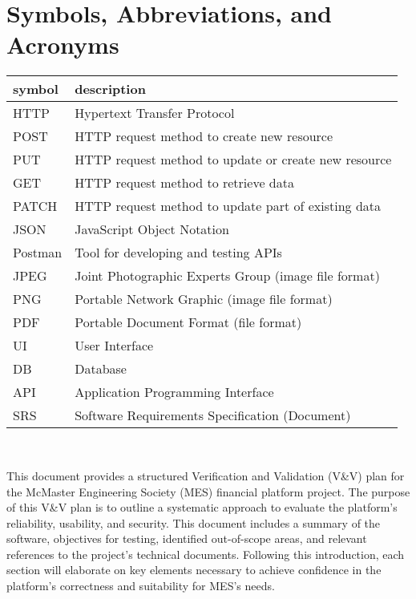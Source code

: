 \documentclass[12pt, titlepage]{article}
\begin{document}
\listoftables
{}

\newpage

\section{Symbols, Abbreviations, and Acronyms}

\renewcommand{\arraystretch}{1.2}
\begin{tabular}{l l} 
  \toprule		
  \textbf{symbol} & \textbf{description}\\
  \midrule 
  HTTP & Hypertext Transfer Protocol\\
  POST & HTTP request method to create new resource\\
  PUT & HTTP request method to update or create new resource\\
  GET & HTTP request method to retrieve data\\
  PATCH & HTTP request method to update part of existing data\\
  JSON & JavaScript Object Notation\\
  Postman & Tool for developing and testing APIs\\
  JPEG & Joint Photographic Experts Group (image file format)\\
  PNG & Portable Network Graphic (image file format)\\
  PDF & Portable Document Format (file format)\\
  UI & User Interface\\
  DB & Database\\
  API & Application Programming Interface\\
  SRS & Software Requirements Specification (Document)\\
  \bottomrule
\end{tabular}\\



\newpage


This document provides a structured Verification and Validation (V\&V) plan for the McMaster Engineering Society (MES) financial platform project. The purpose of this V\&V plan is to outline a systematic approach to evaluate the platform's reliability, usability, and security. This document includes a summary of the software, objectives for testing, identified out-of-scope areas, and relevant references to the project's technical documents. Following this introduction, each section will elaborate on key elements necessary to achieve confidence in the platform's correctness and suitability for MES’s needs.
\end{document}
